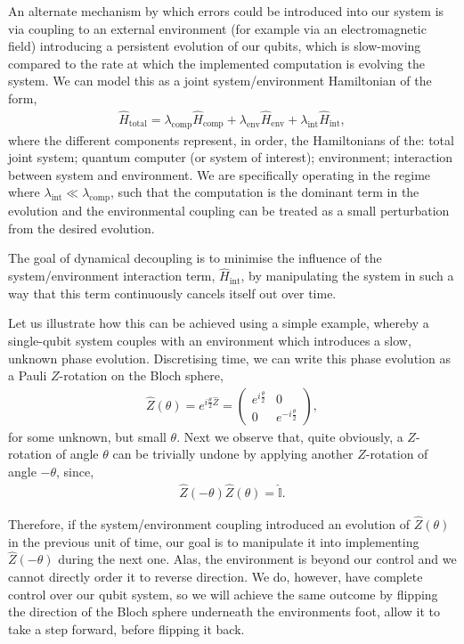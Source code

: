 An alternate mechanism by which errors could be introduced into our system is via coupling to an external environment (for example via an electromagnetic field) introducing a persistent evolution of our qubits, which is slow-moving compared to the rate at which the implemented computation is evolving the system. We can model this as a joint system/environment Hamiltonian of the form,
\begin{align}\label{eq:dyn_dec_ham}
\hat{H}_\mathrm{total} = \lambda_\mathrm{comp}\hat{H}_\mathrm{comp} + \lambda_\mathrm{env}\hat{H}_\mathrm{env} + \lambda_\mathrm{int}\hat{H}_\mathrm{int},	
\end{align}
where the different components represent, in order, the Hamiltonians of the: total joint system; quantum computer (or system of interest); environment; interaction between system and environment. We are specifically operating in the regime where \mbox{$\lambda_\mathrm{int}\ll\lambda_\mathrm{comp}$}, such that the computation is the dominant term in the evolution and the environmental coupling can be treated as a small perturbation from the desired evolution.

The goal of dynamical decoupling is to minimise the influence of the system/environment interaction term, $\hat{H}_\mathrm{int}$, by manipulating the system in such a way that this term continuously cancels itself out over time.

Let us illustrate how this can be achieved using a simple example, whereby a single-qubit system couples with an environment which introduces a slow, unknown phase evolution. Discretising time, we can write this phase evolution as a Pauli $Z$-rotation on the Bloch sphere,
\begin{align}
	\hat{Z}(\theta) = e^{i\frac{\theta}{2}\hat{Z}} = \left(\begin{matrix}
  e^{i\frac{\theta}{2}} & 0 \\
  0 & e^{-i\frac{\theta}{2}}
\end{matrix}\right),
\end{align}
for some unknown, but small $\theta$. Next we observe that, quite obviously, a $Z$-rotation of angle $\theta$ can be trivially undone by applying another $Z$-rotation of angle $-\theta$, since,
\begin{align}
\hat{Z}(-\theta)\hat{Z}(\theta) = \hat{\mathbb{I}}.	
\end{align}

Therefore, if the system/environment coupling introduced an evolution of $\hat{Z}(\theta)$ in the previous unit of time, our goal is to manipulate it into implementing $\hat{Z}(-\theta)$ during the next one. Alas, the environment is beyond our control and we cannot directly order it to reverse direction. We do, however, have complete control over our qubit system, so we will achieve the same outcome by flipping the direction of the Bloch sphere underneath the environments foot, allow it to take a step forward, before flipping it back.

